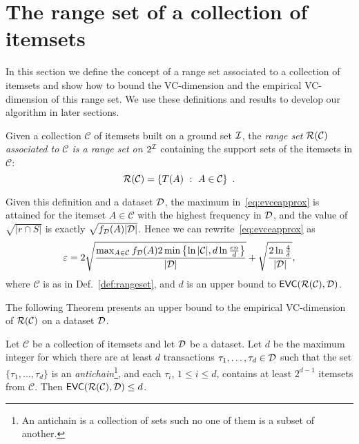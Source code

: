 \section{The range set of a collection of itemsets}\label{sec:range}
In this section we define the concept of a range set associated to a
collection of itemsets and show how to bound the VC-dimension and the
empirical VC-dimension of this range set. We use these definitions and results
to develop our algorithm in later sections.

\begin{definition}\label{def:rangeset}
Given a collection $\mathcal{C}$ of itemsets built on a ground set ${\cal I}$, the
\emph{range set $\mathcal{R}(\mathcal{C})$ associated to $\mathcal{C}$ is a range
set on $2^{\cal I}$} containing the support sets of the itemsets in $\mathcal{C}$:
\[
	\mathcal{R}(\mathcal{C})=\{T(A) ~:~ A\in\mathcal{C}\}\enspace.
\]
\end{definition}

\begin{fact}\label{fact:maxfreq}
	Given this definition and a dataset ${\cal D}$, the maximum
	in~\eqref{eq:evceapprox} is attained for the itemset $A\in\mathcal{C}$ with the
	highest frequency in ${\cal D}$, and the value of $\sqrt{|r\cap S|}$ is exactly
	$\sqrt{f_{\cal D}(A)|{\cal D}|}$. Hence we can rewrite~\eqref{eq:evceapprox} as
	\begin{equation}\label{eq:evceapproxitemsets}
		\varepsilon =
		2\sqrt{\frac{\max_{A\in\mathcal{C}}f_{\cal D}(A)2\min\left\{\ln|\mathcal{C}|,d\ln\frac{en}{d}\right\}}{|{\cal D}|}} +
		\sqrt{\frac{2\ln\frac{4}{\delta}}{|{\cal D}|}},
	\end{equation}
	where $\mathcal{C}$ is as in Def.~\ref{def:rangeset}, and $d$ is an
	upper bound to $\mathsf{EVC}(\mathcal{R}(\mathcal{C}),{\cal D})$.
\end{fact}

The following Theorem presents an upper bound to the empirical VC-dimension of
$\mathcal{R}(\mathcal{C})$ on a dataset ${\cal D}$.

\begin{theorem}\label{lem:evcdimupbound}
  Let $\mathcal{C}$ be a collection of itemsets and let ${\cal D}$ be a dataset. Let
  $d$ be the maximum integer for which there are at least $d$
  transactions $\tau_1,\dotsc,\tau_d\in {\cal D}$ such that the set
  $\{\tau_1,\dotsc,\tau_d\}$ is an \emph{antichain}\footnote{An antichain is a
  collection of sets such no one of them is a subset of another.}, and each
  $\tau_i$, $1\le i\le d$, contains at least $2^{d-1}$ itemsets from
  $\mathcal{C}$.
  Then $\mathsf{EVC}(\mathcal{R}(\mathcal{C}),{\cal D})\le d$.
\end{theorem}

